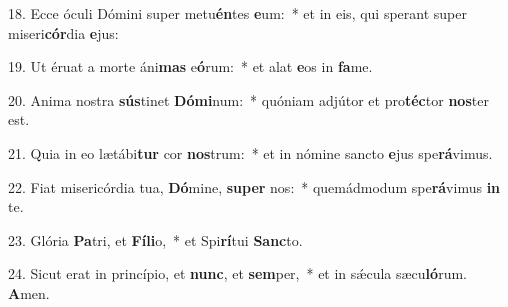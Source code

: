 18. Ecce óculi Dómini super metu\textbf{én}tes \textbf{e}um:~*  et in eis, qui sperant super miseri\textbf{cór}dia \textbf{e}jus:\

19. Ut éruat a morte áni\textbf{mas} e\textbf{ó}rum:~*  et alat \textbf{e}os in \textbf{fa}me.\

20. Anima nostra \textbf{sús}tinet \textbf{Dó}\textbf{mi}num:~*  quóniam adjútor et pro\textbf{téc}tor \textbf{nos}ter est.\

21. Quia in eo lætábi\textbf{tur} cor \textbf{nos}trum:~*  et in nómine sancto \textbf{e}jus spe\textbf{rá}vimus.\

22. Fiat misericórdia tua, \textbf{Dó}mine, \textbf{su}\textbf{per} nos:~*  quemádmodum spe\textbf{rá}vimus \textbf{in} te.\

23. Glória \textbf{Pa}tri, et \textbf{Fí}\textbf{li}o,~*  et Spi\textbf{rí}tui \textbf{Sanc}to.\

24. Sicut erat in princípio, et \textbf{nunc}, et \textbf{sem}per,~*  et in sǽcula sæcu\textbf{ló}rum. \textbf{A}men.\

